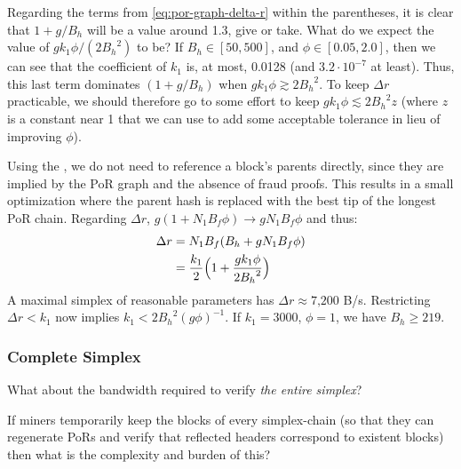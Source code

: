 Regarding the terms from \autoref{eq:por-graph-delta-r} within the parentheses, it is clear that $1 + g/B_h$ will be a value around 1.3, give or take.
What do we expect the value of $g k_1 \phi / (2 {B_h}^2)$ to be?
If $B_h \in [50, 500]$, and $\phi \in [0.05, 2.0]$, then we can see that the coefficient of $k_1$ is, at most, 0.0128 (and $3.2\cdot10^{-7}$ at least).
Thus, this last term dominates $(1+g/B_h)$ when $g k_1 \phi \gtrsim 2 {B_h}^2$.
To keep $\Delta r$ practicable, we should therefore go to some effort to keep $g k_1 \phi \lesssim 2 {B_h}^2 z$ (where $z$ is a constant near 1 that we can use to add some acceptable tolerance in lieu of improving $\phi$).


Using the \AxiomOfUnifiedAncestry, we do not need to reference a block's parents directly, since they are implied by the PoR graph and the absence of fraud proofs.
This results in a small optimization where the parent hash is replaced with the best tip of the longest PoR chain.
Regarding $\Delta r$, $g(1 + N_1 B_f \phi) \to g N_1 B_f \phi$ and thus:
\begin{align}{}
    \Delta r &= N_1 B_f (B_h + g N_1 B_f \phi) \nonumber \\
    &= \frac{k_1}{2}\Bigl(1 + \frac{g {k_1} \phi}{2 {B_h}^2}\Bigr) \nonumber %
\end{align}
A maximal simplex of reasonable parameters has $\Delta r \approx 7\text{,}200$ B/s.
Restricting $\Delta r < k_1$ now implies $k_1 < 2 {B_h}^2 (g \phi)^{-1}$.
If $k_1 = 3000$, $\phi = 1$, we have $B_h \ge 219$.


\subsubsection{Complete Simplex}


What about the bandwidth required to verify \emph{the entire simplex}?

If miners temporarily keep the blocks of every simplex-chain (so that they can regenerate PoRs and verify that reflected headers correspond to existent blocks) then what is the complexity and burden of this?

